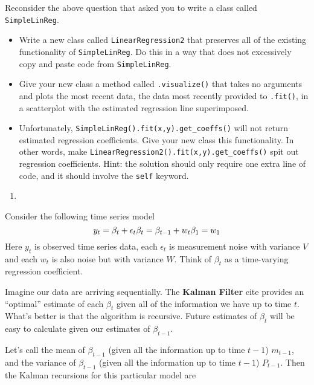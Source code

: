 \documentclass[
  12pt,
  krantz2]{krantz}
\providecommand{\tightlist}{%
  \setlength{\itemsep}{0pt}\setlength{\parskip}{0pt}}
\begin{document}
Reconsider the above question that asked you to write a class called \texttt{SimpleLinReg}.

\begin{itemize}
\tightlist
\item
  Write a new class called \texttt{LinearRegression2} that preserves all of the existing functionality of \texttt{SimpleLinReg}. Do this in a way that does not excessively copy and paste code from \texttt{SimpleLinReg}.
\item
  Give your new class a method called \texttt{.visualize()} that takes no arguments and plots the most recent data, the data most recently provided to \texttt{.fit()}, in a scatterplot with the estimated regression line superimposed.
\item
  Unfortunately, \texttt{SimpleLinReg().fit(x,y).get\_coeffs()} will not return estimated regression coefficients. Give your new class this functionality. In other words, make \texttt{LinearRegression2().fit(x,y).get\_coeffs()} spit out regression coefficients. Hint: the solution should only require one extra line of code, and it should involve the \texttt{self} keyword.
\end{itemize}

\begin{enumerate}
\def\labelenumi{\arabic{enumi}.}
\setcounter{enumi}{2}
\tightlist
\item
\end{enumerate}

Consider the following time series model \citep{West1989BayesianFA}
\begin{equation} 
y_t = \beta_t + \epsilon_t \\
\beta_t = \beta_{t-1} + w_t \\
\beta_1 = w_1
\end{equation}
Here \(y_t\) is observed time series data, each \(\epsilon_t\) is measurement noise with variance \(V\) and each \(w_t\) is also noise but with variance \(W\). Think of \(\beta_t\) as a time-varying regression coefficient.

Imagine our data are arriving sequentially. The \textbf{Kalman Filter} \citep{kalman_filt} cite provides an ``optimal'' estimate of each \(\beta_t\) given all of the information we have up to time \(t\). What's better is that the algorithm is recursive. Future estimates of \(\beta_t\) will be easy to calculate given our estimates of \(\beta_{t-1}\).

Let's call the mean of \(\beta_{t-1}\) (given all the information up to time \(t-1\)) \(m_{t-1}\), and the variance of \(\beta_{t-1}\) (given all the information up to time \(t-1\)) \(P_{t-1}\). Then the Kalman recursions for this particular model are
\end{document}
